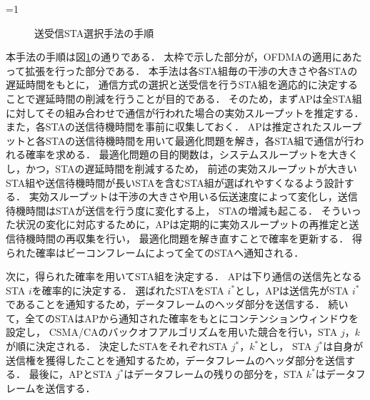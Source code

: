 \documentclass[master]{kuisthesis}		%
\newcommand{\sij}{(i,j)}
\def\equiv{\mathrel{\mathop:}=}
\newcommand{\sijk}{(i,j,k)}
\newcommand{\rijk}{r^{(i,j,k)}}
\newcounter{flagFig}
\begin{document}
				\ifnum\value{flagFig}=1 {\begin{figure}[t]
					\centering
					\caption{送受信STA選択手法の手順}
					\label{fig:process}
				\end{figure}}\fi
				本手法の手順は図\ref{fig:process}の通りである．
				太枠で示した部分が，OFDMAの適用にあたって拡張を行った部分である．
				本手法は各STA組毎の干渉の大きさや各STAの遅延時間をもとに，
				通信方式の選択と送受信を行うSTA組を適応的に決定することで遅延時間の削減を行うことが目的である．
				そのため，まずAPは全STA組に対してその組み合わせで通信が行われた場合の実効スループットを推定する．
				また，各STAの送信待機時間を事前に収集しておく．
				APは推定されたスループットと各STAの送信待機時間を用いて最適化問題を解き，各STA組で通信が行われる確率を求める．
				最適化問題の目的関数は，システムスループットを大きくし，かつ，STAの遅延時間を削減するため，
				前述の実効スループットが大きいSTA組や送信待機時間が長いSTAを含むSTA組が選ばれやすくなるよう設計する．
				実効スループットは干渉の大きさや用いる伝送速度によって変化し，送信待機時間はSTAが送信を行う度に変化する上，
				STAの増減も起こる．
				そういった状況の変化に対応するために，APは定期的に実効スループットの再推定と送信待機時間の再収集を行い，
				最適化問題を解き直すことで確率を更新する．
				得られた確率はビーコンフレームによって全てのSTAへ通知される．
				\par
				次に，得られた確率を用いてSTA組を決定する．
				APは下り通信の送信先となるSTA $i$を確率的に決定する．
				選ばれたSTAをSTA $i^*$とし，APは送信先がSTA $i^*$であることを通知するため，データフレームのヘッダ部分を送信する．
				続いて，全てのSTAはAPから通知された確率をもとにコンテンションウィンドウを設定し，
				CSMA/CAのバックオフアルゴリズムを用いた競合を行い，STA $j$，$k$が順に決定される．
				決定したSTAをそれぞれSTA $j^*$，$k^*$とし，
				STA $j^*$は自身が送信権を獲得したことを通知するため，データフレームのヘッダ部分を送信する．
				最後に，APとSTA $j^*$はデータフレームの残りの部分を，STA $k^*$はデータフレームを送信する．
\end{document}
